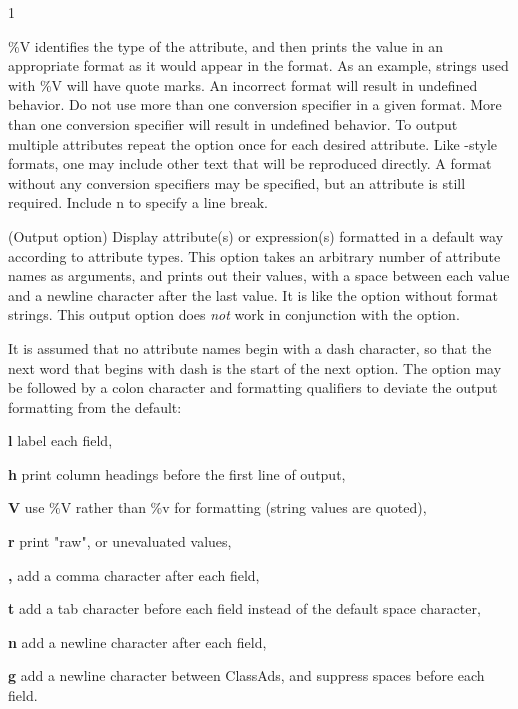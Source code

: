 \begin{ManPage}{\label{man-condor-status}}{1}
\begin{Options}
{      \%V identifies the type of the attribute, 
      and then prints the value in an appropriate format as it would
      appear in the  format.
      As an example, strings used with \%V will have quote marks.
      An incorrect format will result in undefined behavior.
      Do not use more than one conversion specifier in a given
      format.  More than one conversion specifier will result
      in undefined behavior.  To output multiple attributes
      repeat the  option once for each desired
      attribute.
      Like -style formats, one may include other
      text that will be reproduced directly.
      A format without any conversion specifiers may be specified,
      but an attribute is still required.
      Include \Bs n to specify a line break. }


   {
    (Output option) Display attribute(s) or expression(s)
    formatted in a default way according to attribute types.  
    This option takes an arbitrary number of attribute names as arguments,
    and prints out their values, 
    with a space between each value and a newline character after 
    the last value.  
    It is like the  option without format strings.
    This output option does \emph{not} work in conjunction with the
     option.

    It is assumed that no attribute names begin with a dash character,
    so that the next word that begins with dash is the 
    start of the next option.
    The  option may be followed by a colon character
    and formatting qualifiers to deviate the output formatting from
    the default:

    \textbf{l} label each field,

    \textbf{h} print column headings before the first line of output,

    \textbf{V} use \%V rather than \%v for formatting (string values
    are quoted),

    \textbf{r} print "raw", or unevaluated values,

    \textbf{,} add a comma character after each field,

    \textbf{t} add a tab character before each field instead of 
    the default space character,

    \textbf{n} add a newline character after each field,

    \textbf{g} add a newline character between ClassAds, and
    suppress spaces before each field.

}
\end{Options}
\end{ManPage}
